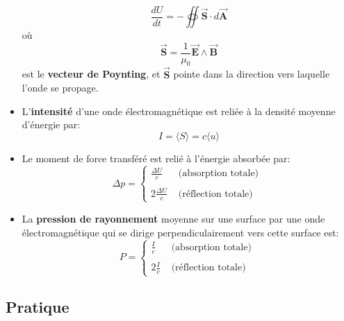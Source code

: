 \documentclass[a4paper]{article}
\begin{document}
\begin{itemize}
\[ \frac{d U}{d t} = - \oiint \vec{\textbf{S}} \cdot d \vec{\textbf{A}} \]
où \[ \vec{\textbf{S}} = \frac{1}{\mu_0} \vec{\textbf{E}} \wedge \vec{\textbf{B}} \]
est le \textbf{vecteur de Poynting}, et $ \vec{\textbf{S}} $ pointe dans la direction vers laquelle l'onde se propage.
    \item L'\textbf{intensité} d'une onde électromagnétique est reliée à la densité moyenne d'énergie par: 
\[ I = \langle S \rangle = c \langle u \rangle \]
    \item Le moment de force transféré est relié à l'énergie absorbée par: 
\[ \Delta p = 
\begin{cases} \displaystyle
\frac{\Delta U}{c}      & \text{ (absorption totale) } \\ \\ \displaystyle
2 \frac{\Delta U}{c}    & \text{ (réflection totale) }
\end{cases} \]
    \item La \textbf{pression de rayonnement} moyenne sur une surface par une onde électromagnétique qui se dirige perpendiculairement 
vers cette surface est: 
\[ P = 
\begin{cases} \displaystyle
\frac{I}{c}             & \text{ (absorption totale) } \\ \\ \displaystyle
2 \frac{I}{c}           & \text{ (réflection totale) }
\end{cases} \]
\end{itemize}















\subsection{Pratique}
\end{document}
